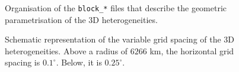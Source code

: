 \begin{center}
\begin{figure}
\center{} 
\caption{Organisation of the \texttt{block\_*} files that describe the geometric parametrisation of the 3D heterogeneities.}\label{F:block_files}
\end{figure}
\end{center}
\begin{center}
\begin{figure}
\center{} 
\caption{Schematic representation of the variable grid spacing of the 3D heterogeneities. Above a radius of $6266$ km, the horizontal grid spacing is $0.1^\circ$. Below, it is $0.25^\circ$.}\label{F:geometry}
\end{figure}
\end{center}
